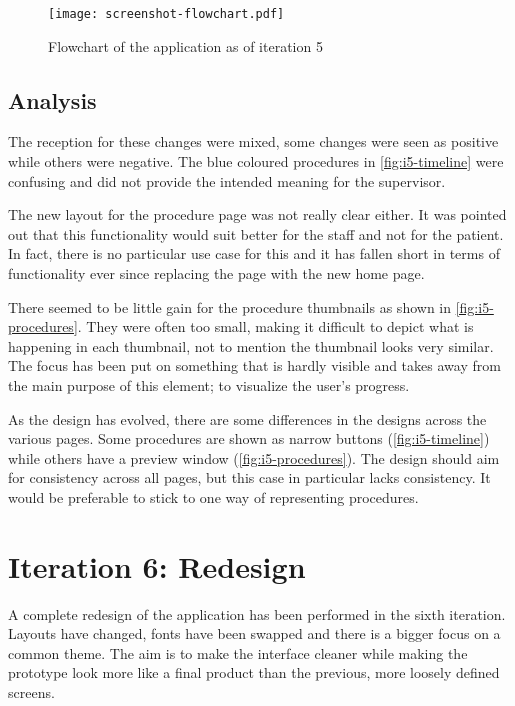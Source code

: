 \begin{figure}
    \centering
    \texttt{[image: screenshot-flowchart.pdf]}
    \caption{Flowchart of the application as of iteration 5}
    \label{fig:i5-flowchart}
\end{figure}

\subsection{Analysis}

The reception for these changes were mixed, some changes were seen as positive while others were negative. The blue coloured procedures in \autoref{fig:i5-timeline} were confusing and did not provide the intended meaning for the supervisor.

The new layout for the procedure page was not really clear either. It was pointed out that this functionality would suit better for the staff and not for the patient. In fact, there is no particular use case for this and it has fallen short in terms of functionality ever since replacing the page with the new home page.

There seemed to be little gain for the procedure thumbnails as shown in \autoref{fig:i5-procedures}. They were often too small, making it difficult to depict what is happening in each thumbnail, not to mention the thumbnail looks very similar. The focus has been put on something that is hardly visible and takes away from the main purpose of this element; to visualize the user's progress.

As the design has evolved, there are some differences in the designs across the various pages. Some procedures are shown as narrow buttons (\autoref{fig:i5-timeline}) while others have a preview window (\autoref{fig:i5-procedures}). The design should aim for consistency across all pages, but this case in particular lacks consistency. It would be preferable to stick to one way of representing procedures.

\section{Iteration 6: Redesign}
\label{sec:iteration6}

A complete redesign of the application has been performed in the sixth iteration. Layouts have changed, fonts have been swapped and there is a bigger focus on a common theme. The aim is to make the interface cleaner while making the prototype look more like a final product than the previous, more loosely defined screens.

